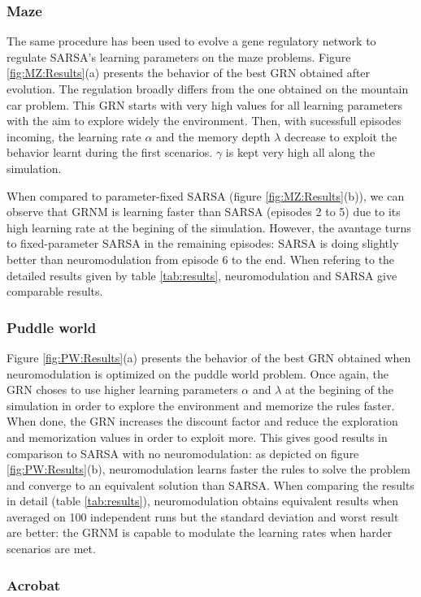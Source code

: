 \subsubsection{Maze}
The same procedure has been used to evolve a gene regulatory network to regulate SARSA's learning parameters on the maze problems. Figure \ref{fig:MZ:Results}(a) presents the behavior of the best GRN obtained after evolution. The regulation broadly differs from the one obtained on the mountain car problem. This GRN starts with very high values for all learning parameters with the aim to explore widely the environment. Then, with sucessfull episodes incoming, the learning rate $\alpha$ and the memory depth $\lambda$ decrease to exploit the behavior learnt during the first scenarios. $\gamma$ is kept very high all along the simulation.

When compared to parameter-fixed SARSA (figure \ref{fig:MZ:Results}(b)), we can observe that GRNM is learning faster than SARSA (episodes 2 to 5) due to its high learning rate at the begining of the simulation. However, the avantage turns to fixed-parameter SARSA in the remaining episodes: SARSA is doing slightly better than neuromodulation from episode 6 to the end. When refering to the detailed results given by table \ref{tab:results}, neuromodulation and SARSA give comparable results. 

\subsubsection{Puddle world}
Figure \ref{fig:PW:Results}(a) presents the behavior of the best GRN obtained when neuromodulation is optimized on the puddle world problem. Once again, the GRN choses to use higher learning parameters $\alpha$ and $\lambda$ at the begining of the simulation in order to explore the environment and memorize the rules faster. When done, the GRN increases the discount factor and reduce the exploration and memorization values in order to exploit more. This gives good results in comparison to SARSA with no neuromodulation: as depicted on figure \ref{fig:PW:Results}(b), neuromodulation learns faster the rules to solve the problem and converge to an equivalent solution than SARSA. When comparing the results in detail (table \ref{tab:results}), neuromodulation obtains equivalent results when averaged on 100 independent runs but the standard deviation and worst result are better: the GRNM is capable to modulate the learning rates when harder scenarios are met. 

\subsubsection{Acrobat}

